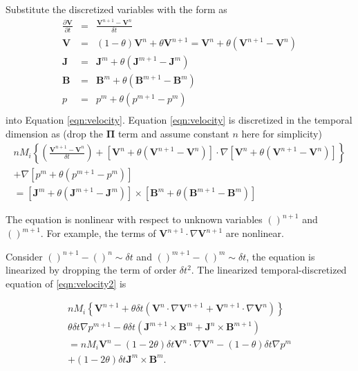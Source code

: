 \documentclass[11pt]{article}  %
\begin{document}
Substitute the discretized variables with the form as
\begin{eqnarray}
  \frac{\partial \mathbf{V}} {  \partial t} &=&  \frac{\mathbf{V}^{n+1}-\mathbf{V}^{n}} { \delta t} \\
   \mathbf{V} &=&(1-\theta)\mathbf{V}^{n} + \theta \mathbf{V}^{n+1} = \mathbf{V}^n + \theta(\mathbf{V}^{n+1}-\mathbf{V}^n) \\
   \mathbf{J} &=&\mathbf{J}^m + \theta(\mathbf{J}^{m+1}-\mathbf{J}^m) \\
    \mathbf{B} &=&\mathbf{B}^m + \theta(\mathbf{B}^{m+1}-\mathbf{B}^m) \\
  p &=& p^m + \theta(p^{m+1}-p^m) \\
\end{eqnarray}
into Equation \ref{eqn:velocity}. 
Equation \ref{eqn:velocity} is discretized in the temporal dimension as (drop the $\mathbf{\Pi}$ term and assume constant $n$ here for simplicity)
\begin{eqnarray}
nM_i \left\{( \frac{\mathbf{V}^{n+1}-\mathbf{V}^{n} } { \delta t} ) 
+ \left[\mathbf{V}^n + \theta(\mathbf{V}^{n+1}-\mathbf{V}^n) \right] \cdot \nabla \left[\mathbf{V}^n + \theta(\mathbf{V}^{n+1}-\mathbf{V}^n)  \right] \right\}  \nonumber \\
+ \nabla \left[p^m + \theta(p^{m+1}-p^m) \right]  \nonumber \\
= \left[\mathbf{J}^m + \theta(\mathbf{J}^{m+1}-\mathbf{J}^m) \right] \times \left[ \mathbf{B}^m + \theta(\mathbf{B}^{m+1}-\mathbf{B}^m) \right]   \label{eqn:velocity2}
\end{eqnarray}

The equation is nonlinear with respect to unknown variables $()^{n+1}$ and $()^{m+1}$. For example, the terms of $\mathbf{V}^{n+1}\cdot \nabla \mathbf{V}^{n+1}$ are nonlinear.

Consider $()^{n+1}-()^n \sim \delta t$ and $()^{m+1}-()^m \sim \delta t$, the equation is linearized by dropping the term of order $\delta t^2$. The linearized temporal-discretized equation of \ref{eqn:velocity2} is

\begin{eqnarray}
nM_i \left\{ \mathbf{V}^{n+1}   +\theta \delta t  (\mathbf{V}^n \cdot \nabla \mathbf{V}^{n+1} + \mathbf{V}^{n+1} \cdot\nabla \mathbf{V}^{n})  \right\}    \nonumber \\
  \theta \delta t  \nabla p^{m+1} -  \theta \delta t (\mathbf{J}^{m+1}\times \mathbf{B}^m+\mathbf{J}^{n}\times \mathbf{B}^{m+1})  \nonumber \\
      = nM_i  \mathbf{V}^{n}  - (1-2 \theta) \delta t  \mathbf{V}^n \cdot \nabla \mathbf{V}^{n}
 -(1-\theta) \delta t  \nabla p^{m}  \nonumber \\
 +(1-2\theta) \delta t  \mathbf{J}^{m}\times \mathbf{B}^m. \label{eqn:velocityLin}
\end{eqnarray}
\end{document}

